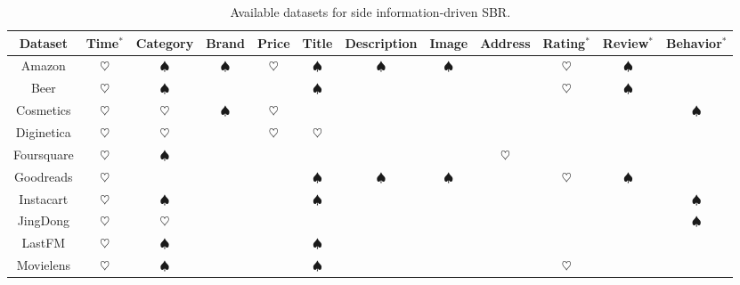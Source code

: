 \documentclass[lettersize,journal]{IEEEtran}
\begin{document}
\begin{table}[th]
\small
\tabcolsep 0.09in 
  \caption{Available datasets for side information-driven SBR.}

\begin{tabular}{c|c|c|c|    c|c|c|c|    c|c|c|c}
\toprule
{Dataset}  & {Time$^*$} & {Category}    & {Brand}   & {Price}   & {Title}   & {Description} & {Image}    & {Address}   & {Rating$^*$}  & {Review$^*$}  & {Behavior$^*$}\\ 
\hline
{Amazon} & {$\heartsuit$} & {$\spadesuit$}  & {$\spadesuit$}  & {$\heartsuit$}  & {$\spadesuit$}  &{$\spadesuit$}   & {$\spadesuit$} & {}   & {$\heartsuit$}  &{$\spadesuit$}   & {}  \\ 
 \hline
{Beer} & {$\heartsuit$}  & {$\spadesuit$}                     & {} & {} & {$\spadesuit$}                     & {} & {} & {}   & {$\heartsuit$}  & {$\spadesuit$} & {} \\ 
\hline
{Cosmetics} &{$\heartsuit$} & {$\heartsuit$}  & {$\spadesuit$}  & {$\heartsuit$}  & {}    & {}    & {}   & {}    & {}    & {}    & {$\spadesuit$}  \\ 
\hline
{Diginetica} & {$\heartsuit$}   & {$\heartsuit$}  & {}    & {$\heartsuit$}  & {$\heartsuit$}  & {}    & {}   & {}   &{} & {}    & {}    \\
\hline
{Foursquare}       & {$\heartsuit$}    & {$\spadesuit$}                     & {} & {} & {} & {} & {}     & {$\heartsuit$}  & {}   & {}  & {}   \\ 
\hline
{Goodreads}  & {$\heartsuit$} &{} &{} &{} &{$\spadesuit$}   & {$\spadesuit$}  & {$\spadesuit$}  & {}  & {$\heartsuit$}  & {$\spadesuit$}  & {}    \\ 
\hline
{Instacart} & {$\heartsuit$}  &{$\spadesuit$} &{} &{} &{$\spadesuit$}   & {}  & {}  & {}  & {}  & {}  & {$\spadesuit$}    \\ 
\hline
{JingDong} & {$\heartsuit$} & {$\heartsuit$}                     & {} & {} & {} & {} & {}     & {}  & {} & {} & {$\spadesuit$}   \\ 
\hline
{LastFM}    & {$\heartsuit$}   & {$\spadesuit$}   & {} & {} & {$\spadesuit$}    & {}    & {}  & {}   & {}  & {}  & {}    \\ 
\hline
{Movielens}   & {$\heartsuit$}   & {$\spadesuit$}   & {} & {} & {$\spadesuit$}    & {}    & {}   & {}   & {$\heartsuit$}  & {}  & {}    \\ 

\end{tabular}
\end{table}
\end{document}
